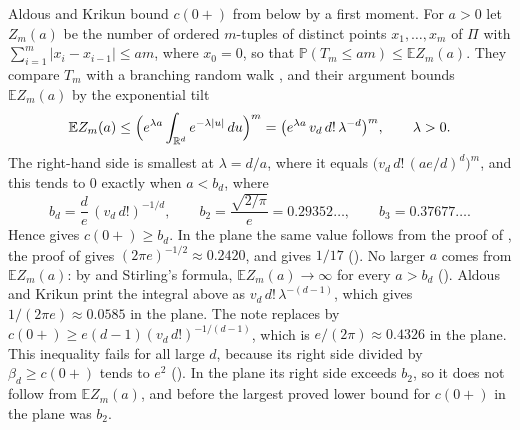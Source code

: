 \documentclass[11pt]{article}
\theoremstyle{remark}
\newcommand{\R}{\mathbb{R}}
\newcommand{\E}{\mathbb{E}}
\newcommand{\Prob}{\mathbb{P}}
\begin{document}
Aldous and Krikun bound $c(0+)$ from below by a first moment. For $a>0$ let $Z_m(a)$ be the number of ordered
$m$-tuples of distinct points $x_1,\dots,x_m$ of $\Pi$ with $\sum_{i=1}^m|x_i-x_{i-1}|\le am$, where $x_0=0$, so that
$\Prob(T_m\le am)\le\E Z_m(a)$. They compare $T_m$ with a branching random walk \cite[Section~3.3]{AK}, and their
argument bounds $\E Z_m(a)$ by the exponential tilt
\[
\E Z_m(a)\le\Bigl(e^{\lambda a}\int_{\R^d}e^{-\lambda|u|}\,du\Bigr)^m
=\bigl(e^{\lambda a}\,v_d\,d!\,\lambda^{-d}\bigr)^m,\qquad \lambda>0 .
\]
The right-hand side is smallest at $\lambda=d/a$, where it equals $\bigl(v_d\,d!\,(ae/d)^d\bigr)^m$, and this tends to
$0$ exactly when $a<b_d$, where
\[
b_d=\frac de\,(v_d\,d!)^{-1/d},\qquad b_2=\frac{\sqrt{2/\pi}}{e}=0.29352\dots,\qquad b_3=0.37677\dots.
\]
Hence \cite[Theorem~1(e)]{AK} gives $c(0+)\ge b_d$. In the plane the same value follows from the proof of
\cite[Theorem~18]{Carlsson}, the proof of \cite[Lemma~2.1]{GM} gives $(2\pi e)^{-1/2}\approx 0.2420$, and
\cite[Theorem~1]{ADHT} gives $1/17$ (). No larger $a$ comes from $\E Z_m(a)$: by \cite[Corollary~8]{Carlsson} and Stirling's formula,
$\E Z_m(a)\to\infty$ for every $a>b_d$ (). Aldous and Krikun print the integral above \cite[Section~3.3]{AK}
as $v_d\,d!\,\lambda^{-(d-1)}$, which gives $1/(2\pi e)\approx 0.0585$ in the plane. The note \cite{Anote} replaces
\cite[(3.6)]{AK} by $c(0+)\ge e(d-1)(v_d\,d!)^{-1/(d-1)}$, which is $e/(2\pi)\approx 0.4326$ in the plane. This
inequality fails for all large $d$, because its right side divided by $\beta_d\ge c(0+)$ tends to $e^2$
(). In the plane its right side exceeds $b_2$, so it does not follow from $\E Z_m(a)$, and before
 the largest proved lower bound for $c(0+)$ in the plane was $b_2$.
\end{document}
